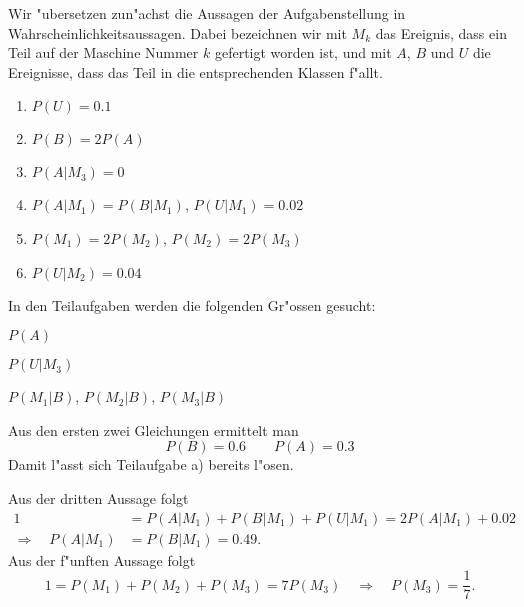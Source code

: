 \begin{loesung}
Wir "ubersetzen zun"achst die Aussagen der Aufgabenstellung
in Wahrscheinlichkeitsaussagen. Dabei bezeichnen wir mit $M_k$ das
Ereignis, dass ein Teil auf der Maschine Nummer $k$ gefertigt
worden ist, und mit $A$, $B$ und $U$ die Ereignisse, dass das Teil
in die entsprechenden Klassen f"allt.
\begin{enumerate}
\item $P(U)=0.1$                                %
\item $P(B)=2P(A)$                              %
\item $P(A|M_3)=0$
\item $P(A|M_1)=P(B|M_1)$, $P(U|M_1)=0.02$
\item $P(M_1)=2P(M_2)$, $P(M_2)=2P(M_3)$
\item $P(U|M_2)=0.04$                           %
\end{enumerate}
In den Teilaufgaben werden die folgenden Gr"ossen gesucht:
\begin{teilaufgaben}
\item $P(A)$
\item $P(U|M_3)$
\item $P(M_1|B)$, $P(M_2|B)$, $P(M_3|B)$
\end{teilaufgaben}

Aus den ersten zwei Gleichungen ermittelt man
\[
P(B)=0.6\qquad P(A)=0.3
\]
Damit l"asst sich Teilaufgabe a) bereits l"osen.

Aus der dritten Aussage folgt
\begin{align*}
1&=P(A|M_1)+P(B|M_1)+P(U|M_1)=2P(A|M_1)+0.02
\\
\Rightarrow\quad
P(A|M_1)&=P(B|M_1)=0.49.
\end{align*}
Aus der f"unften Aussage folgt
\[
1=P(M_1)+P(M_2)+P(M_3)=7P(M_3)
\quad\Rightarrow\quad
P(M_3)=\frac17.
\]


\end{loesung}
